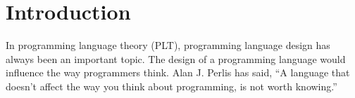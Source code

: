 \section{Introduction}

%
%


In programming language theory (PLT), programming language
design has always been an important topic.
The design of a programming language would influence the way programmers think.
Alan J. Perlis has said, “A language that doesn't affect the
way you think about programming, is not worth knowing.”\cite{perlis1982special}


